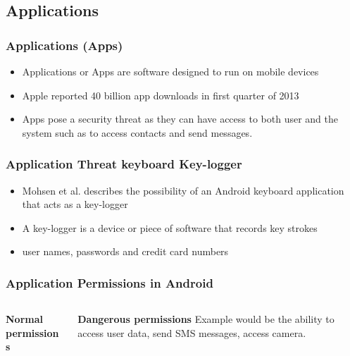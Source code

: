 \documentclass{beamer}
\begin{document}
	\subsection{Applications}
		\begin{frame}
		\frametitle{Applications (Apps)}
		\begin{itemize}
		\item Applications or Apps are software designed to run on mobile devices 
		\item Apple reported 40 billion app downloads in first quarter of 2013 
		\item Apps pose a security threat as they can have access to both user and the system such as to access contacts and send messages.
		\end{itemize}
		\end{frame}
		\begin{frame}
		\frametitle{Application Threat keyboard Key-logger}
		\begin{itemize}
		\item Mohsen et al. describes the possibility of an Android keyboard application that acts as a key-logger
		\item A key-logger is a device or piece of software that records key strokes
		\item user names, passwords and credit card numbers  
		\end{itemize}
		\end{frame}
		\begin{frame}
		\frametitle{Application Permissions in Android}
\begin{center}			
			\begin{columns}[t]
			\begin{column}[T]{5cm}
			 \textbf{Normal permissions}
			\end{column}
			\begin{column}[T]{5cm}
			\textbf{Dangerous permissions}
			Example would be the ability to access user data, send SMS messages, access camera.
			\end{column}
				
			\end{columns}
			\end{center}
		\end{frame}
		
\end{document}

